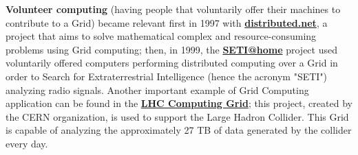 \textbf{Volunteer computing} (having people that voluntarily offer their machines to contribute to a Grid) became relevant first in 1997 with \textbf{\href{https://www.distributed.net/Main_Page}{distributed.net}}, a project that aims to solve mathematical complex and resource-consuming problems using Grid computing; then, in 1999, the \textbf{\href{https://setiathome.berkeley.edu/}{SETI@home}} project used voluntarily offered computers performing distributed computing over a Grid in order to Search for Extraterrestrial Intelligence (hence the acronym "SETI") analyzing radio signals.
Another important example of Grid Computing application can be found in the \textbf{\href{https://wlcg.web.cern.ch/}{LHC Computing Grid}}; this project, created by the CERN organization, is used to support the Large Hadron Collider. This Grid is capable of analyzing the approximately 27 TB of data generated by the collider every day.
